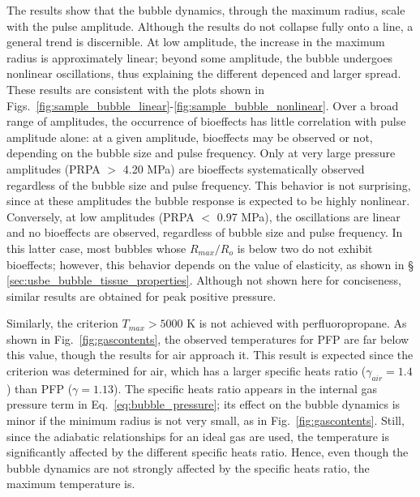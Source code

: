 The results show that the bubble dynamics, through the maximum radius,
scale with the pulse amplitude. Although the results do not collapse fully
onto a line, a general trend is discernible. At low amplitude, the increase in
the maximum radius is approximately linear; beyond some amplitude, the bubble undergoes
nonlinear oscillations, thus explaining the different depenced and larger spread. 
These results are consistent with the plots shown in 
Figs.~\ref{fig:sample_bubble_linear}-\ref{fig:sample_bubble_nonlinear}.
Over a broad range of amplitudes, the
occurrence of bioeffects has little correlation with pulse amplitude
alone: at a given amplitude, bioeffects may be observed or not,
depending on the bubble size and pulse frequency.  Only at very large
pressure amplitudes (PRPA $>$ 4.20 MPa) are bioeffects systematically observed regardless of the
bubble size and pulse frequency. This behavior is not surprising, since at
these amplitudes the bubble response is expected to be highly
nonlinear. Conversely, at low amplitudes (PRPA $<$ 0.97 MPa), the oscillations are 
linear and no bioeffects are observed, regardless of
bubble size and pulse frequency. In this latter case, most bubbles
whose $R_{max}/R_o$ is below two do not exhibit bioeffects; however,
this behavior depends on the value of elasticity, as shown in \S
\ref{sec:usbe_bubble_tissue_properties}.  Although not shown here for conciseness,
similar results are obtained for peak positive pressure.


Similarly, the criterion $T_{max} > 5000$ K is not achieved with perfluoropropane.
As shown in Fig.~\ref{fig:gascontents}, the observed temperatures for
PFP are far below this value, though the results for air approach it. This
result is expected since the criterion was determined for air, which
has a larger specific heats ratio ($\gamma_{air}=1.4$) than
PFP ($\gamma= 1.13$). The specific heats ratio appears in
the internal gas pressure term in Eq.~\ref{eq:bubble_pressure}; its
effect on the bubble dynamics is minor if the minimum radius is not
very small, as in Fig.~\ref{fig:gascontents}. Still, since the
adiabatic relationships for an ideal gas are used, the temperature is
significantly affected by the different specific heats ratio. Hence,
even though the bubble dynamics are not strongly affected by the
specific heats ratio, the maximum temperature is.

